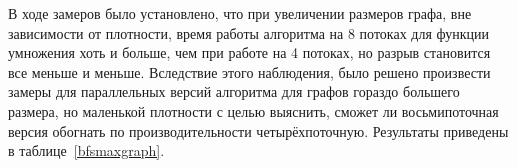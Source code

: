 \begin{table}[h]
\centering
    \caption{Производительность параллельного алгоритма обхода графов в ширину с использованием последовательной функции сложения веторов.}
    \label{bfsparallelmult}
\end{table}

В ходе замеров было установлено, что при увеличении размеров графа, вне зависимости от плотности, время работы алгоритма на 8 потоках для функции умножения хоть и больше, чем при работе на 4 потоках, но разрыв становится все меньше и меньше. Вследствие этого наблюдения, было решено произвести замеры для параллельных версий алгоритма для графов гораздо большего размера, но маленькой плотности с целью выяснить, сможет ли восьмипоточная версия обогнать по производительности четырёхпоточную. Результаты приведены в таблице~\ref{bfsmaxgraph}.

